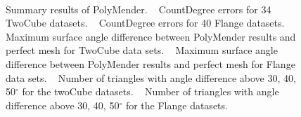 \begin{figure}[p]
		\\
		\caption{Summary results of PolyMender.
			~\protect{} CountDegree errors for 34 TwoCube datasets.
			~\protect{} CountDegree errors for 40 Flange datasets. 
			~\protect{} Maximum surface angle difference between PolyMender results and perfect mesh for TwoCube data sets.
			~\protect{} Maximum surface angle difference between PolyMender results and perfect mesh for Flange data sets.
			~\protect{} Number of triangles with angle difference above 30, 40, 50$^\circ$ for the twoCube datasets.
			~\protect{} Number of triangles with angle difference above 30, 40, 50$^\circ$ for the Flange datasets.}	
		\label{fig:polymenderA}
\end{figure}

